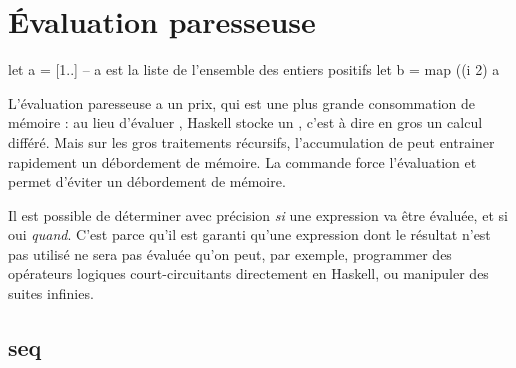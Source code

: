 \section{Évaluation paresseuse}
\label{lazyness}

\begin{haskellcode}
let a = [1..] -- a est la liste de l'ensemble des entiers positifs
let b = map ((^^) 2) a
\end{haskellcode}

L'évaluation paresseuse a un prix, qui est une plus grande consommation de
mémoire : au lieu d'évaluer , Haskell stocke un , c'est
à dire en gros un calcul différé. Mais sur les gros traitements récursifs,
l'accumulation de  peut entrainer rapidement un
débordement de mémoire. La commande  force l'évaluation et permet
d'éviter un débordement de mémoire.

\begin{infobox}%
Il est possible de déterminer avec précision \emph{si} une expression va être évaluée, et si oui \emph{quand}. C'est parce qu'il est garanti qu'une expression dont le résultat n'est pas utilisé ne sera pas évaluée qu'on peut, par exemple, programmer des opérateurs logiques court-circuitants directement en Haskell, ou manipuler des suites infinies.
\end{infobox}

\subsection[]{seq}
